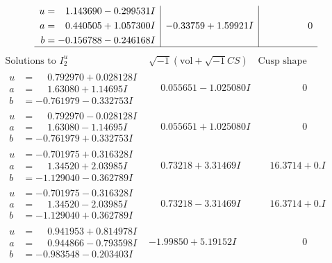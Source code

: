 \documentclass[1p]{elsarticle_modified}
\theoremstyle{definition}
\newcommand{\I}{\sqrt{-1}}
\begin{document}
$$\begin{array}{c|c|c}
\begin{aligned}
u &= \phantom{-}1.143690 - 0.299531 I \\
a &= \phantom{-}0.440505 + 1.057300 I \\
b &= -0.156788 - 0.246168 I\end{aligned}
 & -0.33759 + 1.59921 I & \phantom{-0.000000 } 0\\
 \hline 
 \end{array}$$\newpage$$\begin{array}{c|c|c}  
\text{Solutions to }I^u_{2}& \I (\text{vol} + \sqrt{-1}CS) & \text{Cusp shape}\\
 \hline 
\begin{aligned}
u &= \phantom{-}0.792970 + 0.028128 I \\
a &= \phantom{-}1.63080 + 1.14695 I \\
b &= -0.761979 - 0.332753 I\end{aligned}
 & \phantom{-}0.055651 - 1.025080 I & \phantom{-0.000000 } 0 \\ \hline\begin{aligned}
u &= \phantom{-}0.792970 - 0.028128 I \\
a &= \phantom{-}1.63080 - 1.14695 I \\
b &= -0.761979 + 0.332753 I\end{aligned}
 & \phantom{-}0.055651 + 1.025080 I & \phantom{-0.000000 } 0 \\ \hline\begin{aligned}
u &= -0.701975 + 0.316328 I \\
a &= \phantom{-}1.34520 + 2.03985 I \\
b &= -1.129040 - 0.362789 I\end{aligned}
 & \phantom{-}0.73218 + 3.31469 I & \phantom{-}16.3714 + 0. I\phantom{ +0.000000I} \\ \hline\begin{aligned}
u &= -0.701975 - 0.316328 I \\
a &= \phantom{-}1.34520 - 2.03985 I \\
b &= -1.129040 + 0.362789 I\end{aligned}
 & \phantom{-}0.73218 - 3.31469 I & \phantom{-}16.3714 + 0. I\phantom{ +0.000000I} \\ \hline\begin{aligned}
u &= \phantom{-}0.941953 + 0.814978 I \\
a &= \phantom{-}0.944866 - 0.793598 I \\
b &= -0.983548 - 0.203403 I\end{aligned}
 & -1.99850 + 5.19152 I & \phantom{-0.000000 } 0 \\ \hline\begin{aligned}

\end{aligned}
\end{array}$$
\end{document}
